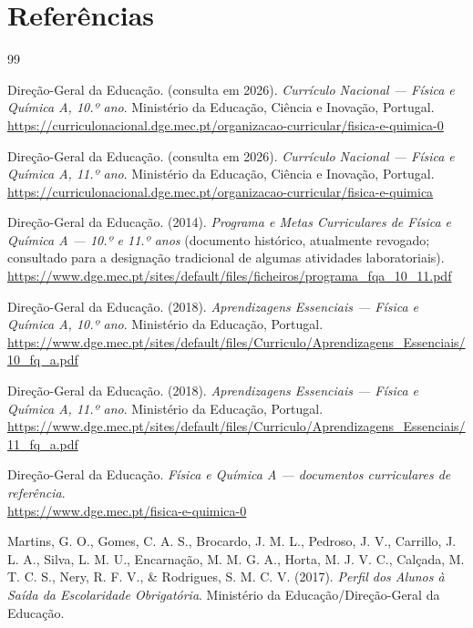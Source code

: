 \documentclass[11pt,a4paper,openany]{book}
\begin{document}
\chapter{Referências}
\begin{thebibliography}{99}

Direção-Geral da Educação. (consulta em 2026). \textit{Currículo Nacional — Física e Química A, 10.º ano}. Ministério da Educação, Ciência e Inovação, Portugal.\\
\url{https://curriculonacional.dge.mec.pt/organizacao-curricular/fisica-e-quimica-0}

Direção-Geral da Educação. (consulta em 2026). \textit{Currículo Nacional — Física e Química A, 11.º ano}. Ministério da Educação, Ciência e Inovação, Portugal.\\
\url{https://curriculonacional.dge.mec.pt/organizacao-curricular/fisica-e-quimica}

Direção-Geral da Educação. (2014). \textit{Programa e Metas Curriculares de Física e Química A — 10.º e 11.º anos} (documento histórico, atualmente revogado; consultado para a designação tradicional de algumas atividades laboratoriais).\\
\url{https://www.dge.mec.pt/sites/default/files/ficheiros/programa_fqa_10_11.pdf}

Direção-Geral da Educação. (2018). \textit{Aprendizagens Essenciais — Física e Química A, 10.º ano}. Ministério da Educação, Portugal.\\
\url{https://www.dge.mec.pt/sites/default/files/Curriculo/Aprendizagens_Essenciais/10_fq_a.pdf}

Direção-Geral da Educação. (2018). \textit{Aprendizagens Essenciais — Física e Química A, 11.º ano}. Ministério da Educação, Portugal.\\
\url{https://www.dge.mec.pt/sites/default/files/Curriculo/Aprendizagens_Essenciais/11_fq_a.pdf}

Direção-Geral da Educação. \textit{Física e Química A — documentos curriculares de referência}.\\
\url{https://www.dge.mec.pt/fisica-e-quimica-0}

Martins, G. O., Gomes, C. A. S., Brocardo, J. M. L., Pedroso, J. V., Carrillo, J. L. A., Silva, L. M. U., Encarnação, M. M. G. A., Horta, M. J. V. C., Calçada, M. T. C. S., Nery, R. F. V., \& Rodrigues, S. M. C. V. (2017). \textit{Perfil dos Alunos à Saída da Escolaridade Obrigatória}. Ministério da Educação/Direção-Geral da Educação.


\end{thebibliography}
\end{document}
